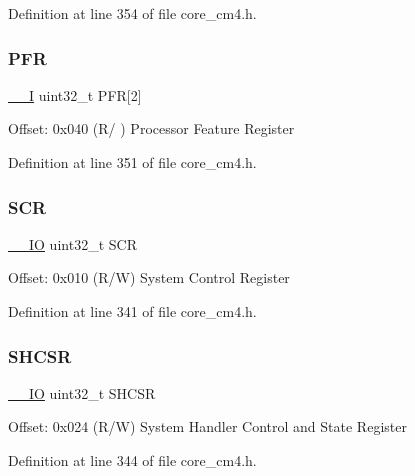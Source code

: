 Definition at line 354 of file core\+\_\+cm4.\+h.

\mbox{\label{struct_s_c_b___type_a00a6649cfac6bbadee51d6ba4c73001d}} 
\subsubsection{\texorpdfstring{P\+FR}{PFR}}
{\footnotesize\ttfamily \hyperlink{group___c_m_s_i_s__core__definitions_gaf63697ed9952cc71e1225efe205f6cd3}{\+\_\+\+\_\+I} uint32\+\_\+t P\+FR\mbox{[}2\mbox{]}}

Offset\+: 0x040 (R/ ) Processor Feature Register 

Definition at line 351 of file core\+\_\+cm4.\+h.

\mbox{\label{struct_s_c_b___type_a64a95891ad3e904dd5548112539c1c98}} 
\subsubsection{\texorpdfstring{S\+CR}{SCR}}
{\footnotesize\ttfamily \hyperlink{group___c_m_s_i_s__core__definitions_gaec43007d9998a0a0e01faede4133d6be}{\+\_\+\+\_\+\+IO} uint32\+\_\+t S\+CR}

Offset\+: 0x010 (R/W) System Control Register 

Definition at line 341 of file core\+\_\+cm4.\+h.

\mbox{\label{struct_s_c_b___type_a04d136e5436e5fa2fb2aaa78a5f86b19}} 
\subsubsection{\texorpdfstring{S\+H\+C\+SR}{SHCSR}}
{\footnotesize\ttfamily \hyperlink{group___c_m_s_i_s__core__definitions_gaec43007d9998a0a0e01faede4133d6be}{\+\_\+\+\_\+\+IO} uint32\+\_\+t S\+H\+C\+SR}

Offset\+: 0x024 (R/W) System Handler Control and State Register 

Definition at line 344 of file core\+\_\+cm4.\+h.

